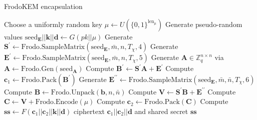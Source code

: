 \begin{algorithm}[t]
\caption{FrodoKEM encapsulation} \label{alg:encaps}
   \begin{flushleft}

  \begin{algorithmic}[1]
	\State Choose a uniformly random key $\mu \leftarrow U(\{0,1\}^{\text{len}_\mu})$
	\State Generate pseudo-random values $\text{seed}_\mathbf{E} || \mathbf{k} || \mathbf{d} \leftarrow G(pk || \mu)$
	\State Generate $\mathbf{S}^\prime \leftarrow \text{Frodo.SampleMatrix}(\text{seed}_\mathbf{E},\bar{m},n,T_\chi,4)$
	\State Generate $\mathbf{E}^\prime \leftarrow \text{Frodo.SampleMatrix}(\text{seed}_\mathbf{E},\bar{m},n,T_\chi,5)$
	 \State Generate $\mathbf{A} \in \mathbb{Z}^{n \times n}_{q}$ via $\mathbf{A} \leftarrow \text{Frodo.Gen}(\text{seed}_\mathbf{A})$
	 \State Compute $\mathbf{B}^\prime \leftarrow \mathbf{S}^\prime \mathbf{A} + \mathbf{E}^\prime$ \label{encapslwe}
	 \State Compute $\mathbf{c}_1 \leftarrow \text{Frodo.Pack}(\mathbf{B}^\prime)$
	 \State Generate $\mathbf{E}^{\prime\prime} \leftarrow \text{Frodo.SampleMatrix}(\text{seed}_\mathbf{E},\bar{m},\bar{n},T_\chi,6	)$
	 \State Compute $\mathbf{B} \leftarrow \text{Frodo.Unpack}(\mathbf{b},n,\bar{n})$
	 \State Compute $\mathbf{V} \leftarrow \mathbf{S}^\prime \mathbf{B} + \mathbf{E}^{\prime\prime}$
	 \State Compute $\mathbf{C} \leftarrow \mathbf{V} + \text{Frodo.Encode}(\mu)$
	 \State Compute $\mathbf{c}_2 \leftarrow \text{Frodo.Pack}(\mathbf{C})$
	 \State Compute $\mathbf{ss} \leftarrow F(\mathbf{c}_1 || \mathbf{c}_2 || \mathbf{k} || \mathbf{d})$
	\State \Return ciphertext $\mathbf{c}_1 || \mathbf{c}_2 || \mathbf{d}$ and shared secret $\mathbf{ss}$
    \EndProcedure
    \end{algorithmic}
        \end{flushleft}

\end{algorithm}

